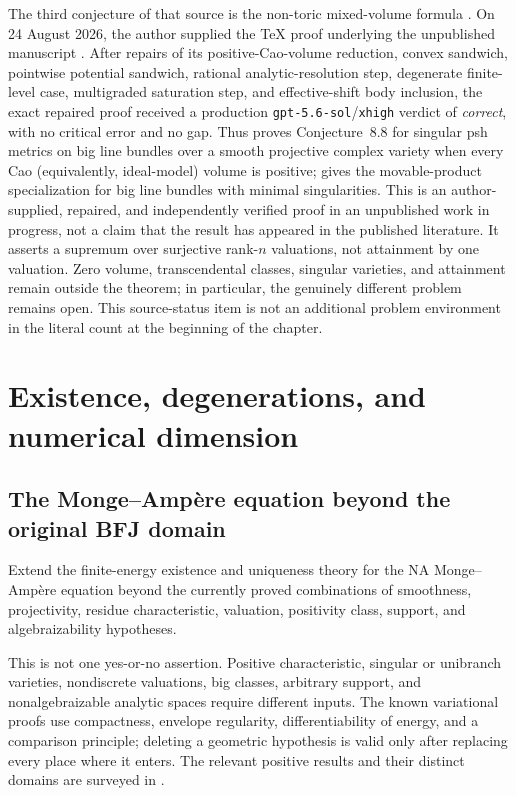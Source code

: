 The third conjecture of that source is the non-toric mixed-volume formula
\cite[Conjecture~8.8]{Xia21}.  On 24 August 2026, the author supplied the TeX
proof underlying the unpublished manuscript \cite{XiaMVOB}.  After repairs
of its positive-Cao-volume reduction, convex sandwich, pointwise potential
sandwich, rational analytic-resolution step, degenerate finite-level case,
multigraded saturation step, and effective-shift body inclusion, the exact
repaired proof received a production \texttt{gpt-5.6-sol}/\texttt{xhigh}
verdict of \emph{correct}, with no critical error and no gap.  Thus
 proves Conjecture~8.8 for singular psh metrics on
big line bundles over a smooth projective complex variety when every Cao
(equivalently, ideal-model) volume is positive;
 gives the movable-product specialization for
big line bundles with minimal singularities.  This is an author-supplied,
repaired, and independently verified proof in an unpublished work in
progress, not a claim that the result has appeared in the published
literature.  It asserts a supremum over surjective rank-\(n\) valuations,
not attainment by one valuation.  Zero volume, transcendental classes,
singular varieties, and attainment remain outside the theorem; in
particular, the genuinely different problem
 remains open.
This source-status item is not an additional problem environment in the
literal count at the beginning of the chapter.

\section{Existence, degenerations, and numerical dimension}
\label{sec:ch72-existence-frontier}

\subsection{The Monge--Ampère equation beyond the original BFJ domain}
\label{sec:ch72-general-ma}

\begin{problem}\label{prob:frontier-general-ma}
Extend the finite-energy existence and uniqueness theory for the NA
Monge--Ampère equation beyond the currently proved combinations of smoothness,
projectivity, residue characteristic, valuation, positivity class, support,
and algebraizability hypotheses.
\end{problem}

This is not one yes-or-no assertion.  Positive characteristic, singular or
unibranch varieties, nondiscrete valuations, big classes, arbitrary support,
and nonalgebraizable analytic spaces require different inputs.  The known
variational proofs use compactness, envelope regularity, differentiability of
energy, and a comparison principle; deleting a geometric hypothesis is valid
only after replacing every place where it enters.  The relevant positive
results and their distinct domains are surveyed in
.

